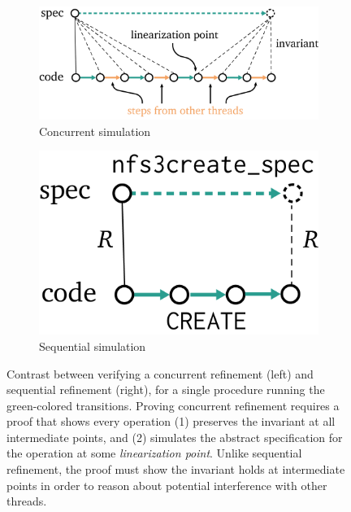 \begin{figure}
  \begin{subfigure}[t]{0.6\textwidth}
  \includegraphics{fig/concurrent-refinement.png}
  \caption{Concurrent simulation}
  \label{fig:refinement:concurrent}
  \end{subfigure}%
%
  \begin{subfigure}[t]{0.4\textwidth}
  \includegraphics{fig/sequential-refinement.png}
  \caption{Sequential simulation}
  \label{fig:refinement:seq}
  \end{subfigure}
  \vspace{0.5\baselineskip}
  \caption[Proving a concurrent simulation]{Contrast between verifying a
    concurrent refinement (left) and sequential refinement (right), for a single
    procedure running the green-colored transitions. Proving concurrent
    refinement requires a proof that shows every operation (1) preserves the
    invariant at all intermediate points, and (2) simulates the abstract
    specification for the operation at some \emph{linearization point}. Unlike
    sequential refinement, the proof must show the invariant holds at
    intermediate points in order to reason about potential interference with
    other threads. }

  \label{fig:concurrent-refinement}
\end{figure}


